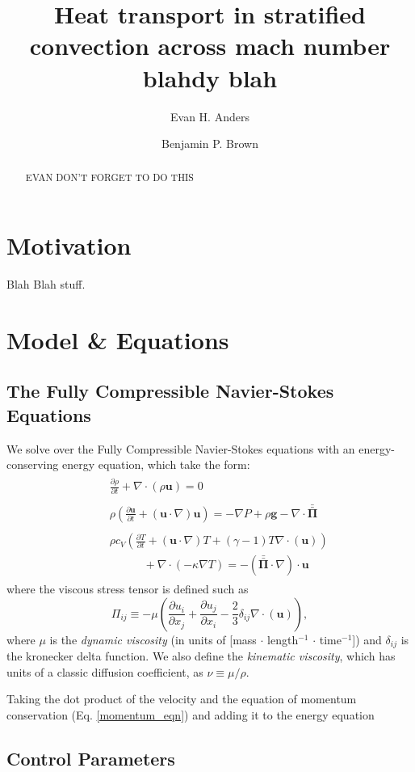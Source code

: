 \documentclass[twocolumn]{aastex6}
\newcommand{\Div}[1]{\ensuremath{\nabla\cdot\left( #1\right)}}
\newcommand{\grad}{\ensuremath{\nabla}}
\newcommand{\stressT}{\ensuremath{\bm{\bar{\bar{\Pi}}}}}
\begin{document}
\author{Evan H. Anders}
\author{Benjamin P. Brown}
\title{Heat transport in stratified convection across mach number blahdy blah}
\begin{abstract}
EVAN DON'T FORGET TO DO THIS
\end{abstract}
\maketitle



\section{Motivation}
Blah Blah stuff.

\section{Model \& Equations}

\subsection{The Fully Compressible Navier-Stokes Equations}
We solve over the Fully Compressible Navier-Stokes equations with an energy-conserving energy equation,
which take the form:
\begin{align}
&\begin{aligned}
&\frac{\partial \rho}{\partial t} + \Div{\rho\bm{u}} = 0
	\label{continuity_eqn}
\end{aligned}\\
&\begin{aligned}
&\rho\left(\frac{\partial \bm{u}}{\partial t} + \left(\bm{u}\cdot\nabla\right)\bm{u}\right) =
-\grad P + \rho\bm{g} - \nabla\cdot\stressT
	\label{momentum_eqn}
\end{aligned}\\
&\begin{aligned}
&\rho c_V\left(\frac{\partial T}{\partial t} + \left(\bm{u}\cdot\grad\right)T + (\gamma-1)T\Div{\bm{u}}\right) \\
&\,\,\,\,\,\,\,\,\,\,\,\,\,\,\,\,\,\,
+ \Div{-\kappa\grad T} = -\left(\stressT\cdot\nabla\right)\cdot\bm{u} 
	\label{energy_eqn}
\end{aligned}
\end{align}
where the viscous stress tensor is defined such as
\begin{equation}
\Pi_{ij} \equiv -\mu\left(\frac{\partial u_i}{\partial x_j} + \frac{\partial u_j}{\partial x_i} - \frac{2}{3}\delta_{ij}\Div{\bm{u}}\right),
\end{equation}
where $\mu$ is the \emph{dynamic viscosity} (in units of [mass $\cdot$ length$^{-1}$ $\cdot$ time$^{-1}$]) and $\delta_{ij}$
is the kronecker delta function.  We also define the \emph{kinematic viscosity}, which has units of a classic diffusion coefficient,
as $\nu \equiv \mu/\rho$.

Taking the dot product of the velocity and the equation of momentum conservation (Eq. \ref{momentum_eqn}) and adding it to the energy
equation



\subsection{Control Parameters}


\end{document}
